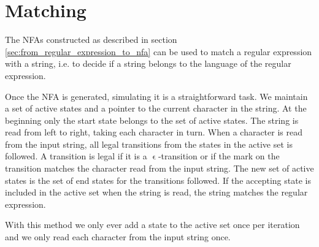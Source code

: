 \section{Matching}

The NFAs constructed as described in section
\vref{sec:from_regular_expression_to_nfa} can be used to match a
regular expression with a string, i.e. to decide if a string belongs
to the language of the regular expression. 


Once the NFA is generated, simulating it is a straightforward task. We
maintain a set of active states and a pointer to the current character
in the string. At the beginning only the start state belongs to the
set of active states. The string is read from left to right, taking
each character in turn. When a character is read from the input
string, all legal transitions from the states in the active set is
followed. A transition is legal if it is a $\upvarepsilon$-transition
or if the mark on the transition matches the character read from the
input string. The new set of active states is the set of end states
for the transitions followed. If the accepting state is included in
the active set when the string is read, the string matches the regular
expression.

With this method we only ever add a state to the active set once per
iteration and we only read each character from the input string once.


